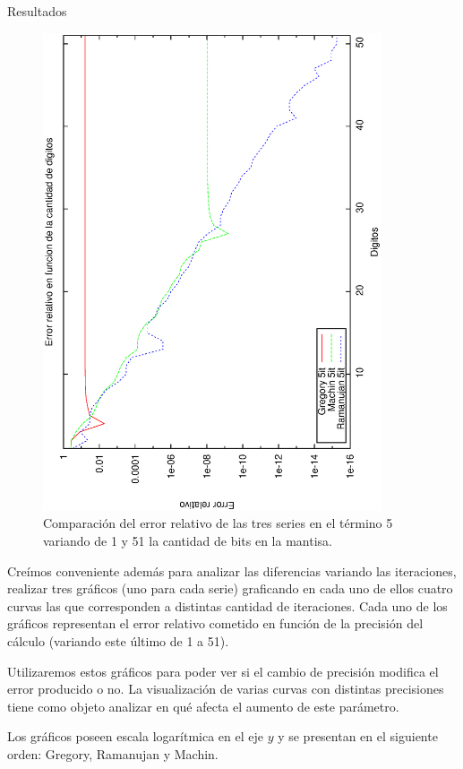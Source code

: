 \begin{section}{Resultados}
	\begin{figure}[H]
	  \centering
		\includegraphics[width=10cm,angle=-90]{graficos/comparacion_5it_1a51p.eps}
	  \caption{Comparación del error relativo de las tres series en el término 5 variando de 1 y 51 la cantidad de bits en la mantisa.}
	  \label{fig:5it}
	\end{figure}
	
	\VSP
	
	Creímos conveniente además para analizar las diferencias variando las iteraciones, realizar tres gráficos (uno para cada serie) graficando en cada uno de ellos cuatro curvas las que corresponden a distintas cantidad de iteraciones. Cada uno de los gráficos representan el error relativo cometido en función de la precisión del cálculo (variando este último de 1 a 51).
	
	Utilizaremos estos gráficos para poder ver si el cambio de precisión modifica el error producido o no. La visualización de varias curvas con distintas precisiones tiene como objeto analizar en qué afecta el aumento de este parámetro.
	
	Los gráficos poseen escala logarítmica en el eje $y$ y se presentan en el siguiente orden: Gregory, Ramanujan y Machin.
	

\end{section}
